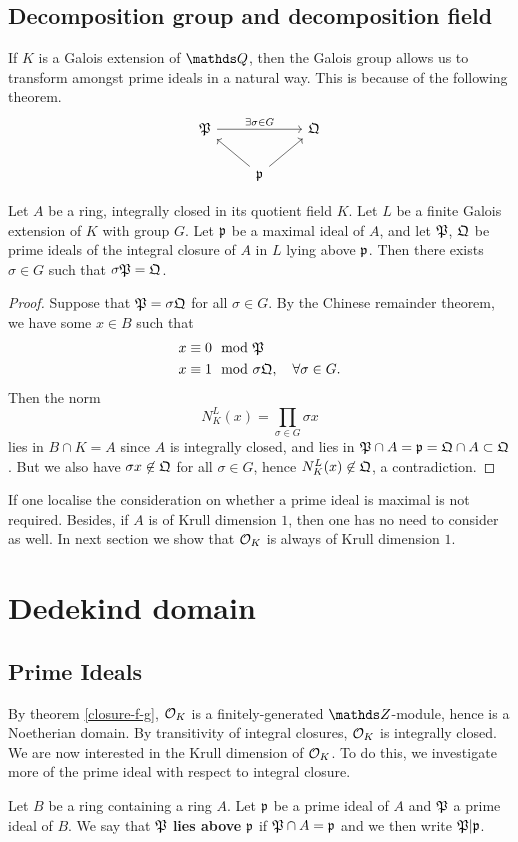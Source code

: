 		\subsection{Decomposition group and decomposition field}
			If $K$ is a Galois extension of $\Q$, then the Galois group allows us to transform amongst prime ideals in a natural way. This is because of the following theorem.
			\[
				\begin{tikzcd}
					\mathfrak{P} \arrow[rr, "\exists \sigma \in G"] &                                    & \mathfrak{Q} \\
					& \mathfrak{p} \arrow[lu] \arrow[ru] &             
				\end{tikzcd}
			\]
			\begin{theorem}
				Let $A$ be a ring, integrally closed in its quotient field $K$. Let $L$ be a finite Galois extension of $K$ with group $G$. Let $\mathfrak{p}$ be a maximal ideal of $A$, and let $\mathfrak{P}$, $\mathfrak{Q}$ be prime ideals of the integral closure of $A$ in $L$ lying above $\mathfrak{p}$. Then there exists $\sigma \in G$ such that $\sigma\mathfrak{P} = \mathfrak{Q}$.
			\end{theorem}
			\begin{proof}
				Suppose that $\mathfrak{P}=\sigma\mathfrak{Q}$ for all $\sigma \in G$. By the Chinese remainder theorem, we have some $x \in B$ such that 
				\[
					\begin{aligned}
						x &\equiv 0 \mod {\mathfrak}{P} \\
						x &\equiv 1 \mod \sigma\mathfrak{Q}, \quad \forall \sigma \in G.
					\end{aligned}
				\]
				Then the norm
				\[
					N_K^L(x) = \prod_{\sigma \in G}\sigma{x}
				\]
				lies in $B \cap K = A$ since $A$ is integrally closed, and lies in $\mathfrak{P} \cap A = \mathfrak{p}=\mathfrak{Q} \cap A \subset \mathfrak{Q}$. But we also have $\sigma{x} \not\in \mathfrak{Q}$ for all $\sigma \in G$, hence $N_K^L(x) \not \in \mathfrak{Q}$, a contradiction.
			\end{proof}
			If one localise the consideration on whether a prime ideal is maximal is not required. Besides, if $A$ is of Krull dimension $1$, then one has no need to consider as well. In next section we show that $\mathcal{O}_K$ is always of Krull dimension $1$.
	\section{Dedekind domain}
		\subsection{Prime Ideals}
			By theorem \ref{closure-f-g}, $\mathcal{O}_K$ is a finitely-generated $\Z$-module, hence is a Noetherian domain. By transitivity of integral closures, $\mathcal{O}_K$ is integrally closed. We are now interested in the Krull dimension of $\mathcal{O}_K$. To do this, we investigate more of the prime ideal with respect to integral closure. 
			\begin{definition}
				Let $B$ be a ring containing a ring $A$. Let $\mathfrak{p}$ be a prime ideal of $A$ and $\mathfrak{P}$ a prime ideal of $B$. We say that $\mathfrak{P}$ \textbf{lies above} $\mathfrak{p}$ if $\mathfrak{P} \cap A = \mathfrak{p}$ and we then write $\mathfrak{P}|\mathfrak{p}$.
			\end{definition}
			
